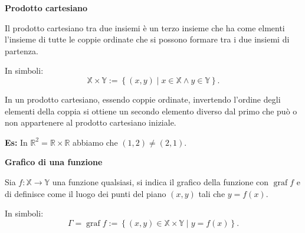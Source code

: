 \begin{definition}
    \textbf{Prodotto cartesiano}

    Il prodotto cartesiano tra due insiemi è un terzo insieme  che ha come elmenti l'insieme
    di tutte le coppie ordinate che si possono formare tra i due insiemi di partenza.
    
    In simboli:
    \[ \mathbb{X} \times \mathbb{Y} := \left\{ \left(x, y\right) \mid x\in\mathbb{X} \land y\in\mathbb{Y} \right\}. \]
\end{definition}

\begin{observation}
    In un prodotto cartesiano, essendo coppie ordinate, invertendo l'ordine degli elementi
    della coppia si ottiene un secondo elemento diverso dal primo che può o non appartenere
    al prodotto cartesiano iniziale.

    \textbf{Es:} In $\mathbb{R}^2=\mathbb{R}\times\mathbb{R}$ abbiamo che $\left(1,2\right)
    \neq\left(2,1\right)$.
\end{observation}

\begin{definition}
    \textbf{Grafico di una funzione}

    Sia $f:\mathbb{X}\rightarrow\mathbb{Y}$ una funzione qualsiasi, si indica il grafico
    della funzione con $\operatorname{graf}f$ e di definisce come il luogo dei punti del piano
    $\left(x,y\right)$ tali che $y=f\left(x\right)$.
    
    In simboli:
    \[
        \Gamma=\operatorname{graf}f:=\left\{
            \left(x,y\right)\in\mathbb{X}\times\mathbb{Y}\mid
            y=f\left(x\right)
        \right\}.
    \]
\end{definition}